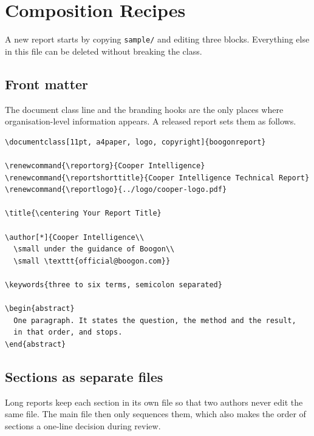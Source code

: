 \section{Composition Recipes}
\label{sec:recipes}

A new report starts by copying \texttt{sample/} and editing three blocks. Everything else in
this file can be deleted without breaking the class.

\subsection{Front matter}

The document class line and the branding hooks are the only places where organisation-level
information appears. A released report sets them as follows.

\begin{verbatim}
\documentclass[11pt, a4paper, logo, copyright]{boogonreport}

\renewcommand{\reportorg}{Cooper Intelligence}
\renewcommand{\reportshorttitle}{Cooper Intelligence Technical Report}
\renewcommand{\reportlogo}{../logo/cooper-logo.pdf}

\title{\centering Your Report Title}

\author[*]{Cooper Intelligence\\
  \small under the guidance of Boogon\\
  \small \texttt{official@boogon.com}}

\keywords{three to six terms, semicolon separated}

\begin{abstract}
  One paragraph. It states the question, the method and the result,
  in that order, and stops.
\end{abstract}
\end{verbatim}

\subsection{Sections as separate files}

Long reports keep each section in its own file so that two authors never edit the same file.
The main file then only sequences them, which also makes the order of sections a one-line
decision during review.

\begin{verbatim}



\end{verbatim}

